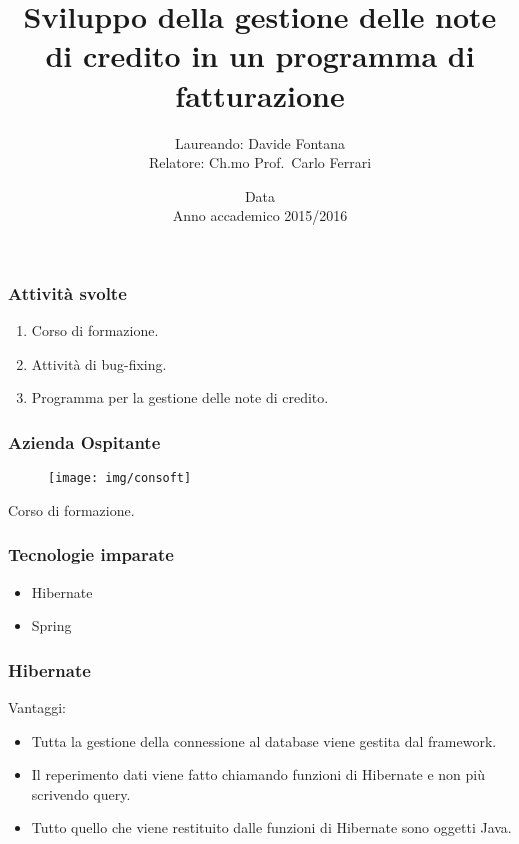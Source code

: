 \documentclass[]{beamer}
\title[Note di credito]{Sviluppo della gestione delle note di credito in un
programma di fatturazione}
\author[Davide Fontana]{Laureando: Davide Fontana \\Relatore: Ch.mo Prof.\ Carlo Ferrari }
\date[Data pié di pagina]{Data \\ Anno accademico 2015/2016}
\institute[DEI Unipd]{Corso di Laurea in Ingegneria Informatica\\ Department of Information Engineering}
\begin{document}
    \frame{\titlepage}

    \begin{frame}
        \frametitle{Attività svolte}
        \begin{enumerate}
            \item Corso di formazione.
            \item Attività di bug-fixing.
            \item Programma per la gestione delle note di credito.
        \end{enumerate}
    \end{frame}

    \begin{frame}
        \frametitle{Azienda Ospitante}
        \begin{figure}[H]
            \centering
            \texttt{[image: img/consoft]}\label{logo:consoft}
        \end{figure}
    \end{frame}

    \begin{frame}
        \begin{center}
            \Huge Corso di formazione.
        \end{center}
    \end{frame}

    \begin{frame}
        \frametitle{Tecnologie imparate}
        \begin{itemize}
            \item Hibernate
            \item Spring
        \end{itemize}
    \end{frame}

    \begin{frame}
        \frametitle{Hibernate}
        Vantaggi:
        \begin{itemize}
            \item Tutta la gestione della connessione al database viene gestita 
                dal framework.
            \item Il reperimento dati viene fatto chiamando funzioni di Hibernate e 
                non più scrivendo query. 
            \item Tutto quello che viene restituito dalle funzioni di Hibernate sono
                oggetti Java.
        \end{itemize}
    \end{frame}
\end{document}
